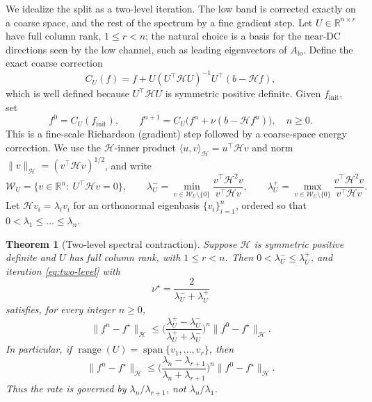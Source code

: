 \documentclass{article}
\newcommand{\R}{\mathbb{R}}
\newtheorem{theorem}{Theorem}
\begin{document}
We idealize the split as a two-level iteration. The low band is corrected exactly on a coarse space, and the rest of the spectrum by a fine gradient step. Let $U\in\R^{n\times r}$ have full column rank, $1\le r<n$; the natural choice is a basis for the near-DC directions seen by the low channel, such as leading eigenvectors of $A_{\mathrm{lo}}$. Define the exact coarse correction
\begin{equation}
\label{eq:coarse}
C_U(f)=f+U(U^\top\mathcal HU)^{-1}U^\top(b-\mathcal Hf),
\end{equation}
which is well defined because $U^\top\mathcal HU$ is symmetric positive definite. Given $f_{\mathrm{init}}$, set
\begin{equation}
\label{eq:two-level}
f^0=C_U(f_{\mathrm{init}}),
\qquad
f^{n+1}=C_U\big(f^n+\nu(b-\mathcal Hf^n)\big),\quad n\ge0.
\end{equation}
This is a fine-scale Richardson (gradient) step followed by a coarse-space energy correction. We use the $\mathcal H$-inner product $\langle u,v\rangle_{\mathcal H}=u^\top\mathcal Hv$ and norm $\|v\|_{\mathcal H}=(v^\top\mathcal Hv)^{1/2}$, and write
\begin{equation}
\label{eq:WU}
\mathcal W_U=\{v\in\R^n:\ U^\top\mathcal Hv=0\},
\qquad
\lambda_U^-=\min_{v\in\mathcal W_U\setminus\{0\}}\frac{v^\top\mathcal H^2v}{v^\top\mathcal Hv},
\qquad
\lambda_U^+=\max_{v\in\mathcal W_U\setminus\{0\}}\frac{v^\top\mathcal H^2v}{v^\top\mathcal Hv}.
\end{equation}
Let $\mathcal Hv_i=\lambda_iv_i$ for an orthonormal eigenbasis $\{v_i\}_{i=1}^n$, ordered so that $0<\lambda_1\le\dots\le\lambda_n$.

\begin{theorem}[Two-level spectral contraction]
\label{thm:two-level}
Suppose $\mathcal H$ is symmetric positive definite and $U$ has full column rank, with $1\le r<n$. Then $0<\lambda_U^-\le\lambda_U^+$, and iteration \eqref{eq:two-level} with
\begin{equation}
\label{eq:nu-star}
\nu^\star=\frac{2}{\lambda_U^-+\lambda_U^+}
\end{equation}
satisfies, for every integer $n\ge0$,
\begin{equation}
\label{eq:two-level-rate}
\|f^n-f^\star\|_{\mathcal H}\le\Big(\frac{\lambda_U^+-\lambda_U^-}{\lambda_U^++\lambda_U^-}\Big)^{n}\|f^0-f^\star\|_{\mathcal H}.
\end{equation}
In particular, if $\operatorname{range}(U)=\operatorname{span}\{v_1,\dots,v_r\}$, then
\begin{equation}
\label{eq:two-level-exact}
\|f^n-f^\star\|_{\mathcal H}\le\Big(\frac{\lambda_n-\lambda_{r+1}}{\lambda_n+\lambda_{r+1}}\Big)^{n}\|f^0-f^\star\|_{\mathcal H}.
\end{equation}
Thus the rate is governed by $\lambda_n/\lambda_{r+1}$, not $\lambda_n/\lambda_1$.
\end{theorem}
\end{document}

